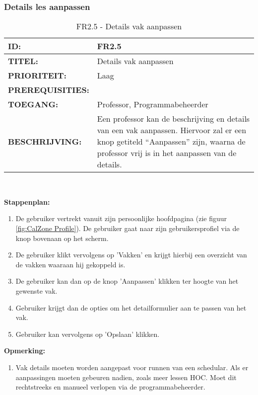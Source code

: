         
\subsubsection{Details les aanpassen} 
\noindent\begin{table}[H]
            \begin{tabular}{l | p{10cm}}
                \textbf{ID:} & FR2.5 \\ \hline
                \textbf{TITEL:} & Details vak aanpassen\\ \hline
                \textbf{PRIORITEIT:} &  Laag \\ \hline
                \textbf{PREREQUISITIES:} & \\ \hline
                \textbf{TOEGANG:} & Professor, Programmabeheerder \\ \hline
                \textbf{BESCHRIJVING:} & Een professor kan de beschrijving en details van een vak aanpassen. Hiervoor zal er een knop getiteld “Aanpassen” zijn, waarna de professor vrij is in het aanpassen van de details. \\ 
            \end{tabular}\\
            \caption{FR2.5 - Details vak aanpassen}
            \label{tab:FR2.5 - Details vak aanpassen}
        \end{table}	
        
\textbf{Stappenplan:}
	\begin{enumerate}
	\item De gebruiker vertrekt vanuit zijn persoonlijke hoofdpagina (zie figuur \ref{fig:CalZone Profile}). De gebruiker gaat naar zijn gebruikersprofiel via de knop bovenaan op het scherm.
	\item De gebruiker klikt vervolgens op 'Vakken' en krijgt hierbij een overzicht van de vakken waaraan hij gekoppeld is.
	\item De gebruiker kan dan op de knop 'Aanpassen' klikken ter hoogte van het gewenste vak.
	\item Gebruiker krijgt dan de opties om het detailformulier aan te passen van het vak.
	\item Gebruiker kan vervolgens op 'Opslaan' klikken.
	\end{enumerate}

\textbf{Opmerking:}
	\begin{enumerate}
	\item Vak details moeten worden aangepast voor runnen van een schedular. Als er aanpassingen moeten gebeuren nadien, zoals meer lessen HOC. Moet dit rechtstreeks en manueel verlopen via de programmabeheerder.
	\end{enumerate}
        
